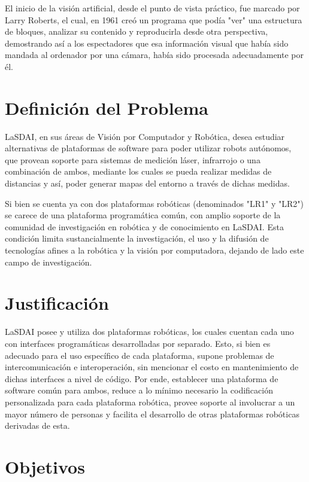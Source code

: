 El inicio de la visión artificial, desde el punto de vista práctico, fue marcado por Larry Roberts, el cual, en 1961 creó un programa que podía "ver" una estructura de bloques, analizar su contenido y reproducirla desde otra perspectiva, demostrando así a los espectadores que esa información visual que había sido mandada al ordenador por una cámara, había sido procesada adecuadamente por él.\citep{bb68865}

\section{Definición del Problema}

LaSDAI, en sus áreas de Visión por Computador y Robótica, desea estudiar alternativas de plataformas de software para poder utilizar robots autónomos, que provean soporte para sistemas de medición láser, infrarrojo o una combinación de ambos, mediante los cuales se pueda realizar medidas de distancias y así, poder generar mapas del entorno a través de dichas medidas.

Si bien se cuenta ya con dos plataformas robóticas (denominados "LR1" y "LR2") se carece de una plataforma programática común, con amplio soporte de la comunidad de investigación en robótica y de conocimiento en LaSDAI. Esta condición limita sustancialmente la investigación, el uso y la difusión de tecnologías afines a la robótica y la visión por computadora, dejando de lado este campo de investigación.

\section{Justificación}

LaSDAI posee y utiliza dos plataformas robóticas, los cuales cuentan cada uno con interfaces programáticas desarrolladas por separado. Esto, si bien es adecuado para el uso específico de cada plataforma, supone problemas de intercomunicación e interoperación, sin mencionar el costo en mantenimiento de dichas interfaces a nivel de código. Por ende, establecer una plataforma de software común para ambos, reduce a lo mínimo necesario la codificación personalizada para cada plataforma robótica, provee soporte al involucrar a un mayor número de personas y facilita el desarrollo de otras plataformas robóticas derivadas de esta.

\section{Objetivos}

